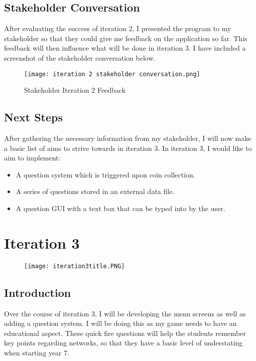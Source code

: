 \documentclass[12pt]{report}
\begin{document}
\pagebreak

\section{Stakeholder Conversation}
After evaluating the success of iteration 2, I presented the program to my stakeholder so that they could give me feedback on the application so far. This feedback will then influence what will be done in iteration 3. I have included a screenshot of the stakeholder conversation below. 

\begin{figure}[H]
    \centering
    \texttt{[image: iteration 2 stakeholder conversation.png]}
    \caption{Stakeholder Iteration 2 Feedback}
\end{figure}

\section{Next Steps}
After gathering the necessary information from my stakeholder, I will now make a basic list of aims to strive towards in iteration 3. In iteration 3, I would like to aim to implement:

\begin{itemize}
    \item A question system which is triggered upon coin collection.
    \item A series of questions stored in an external data file. 
    \item A question GUI with a text box that can be typed into by the user. 
\end{itemize}

\chapter{Iteration 3}

\begin{figure}[H]
    \centering
    \texttt{[image: iteration3title.PNG]}
\end{figure}

\pagebreak

\section{Introduction}
Over the course of iteration 3, I will be developing the menu screens as well as adding a question system. I will be doing this as my game needs to have an educational aspect. These quick fire questions will help the students remember key points regarding networks, so that they have a basic level of understating when starting year 7.
\end{document}
